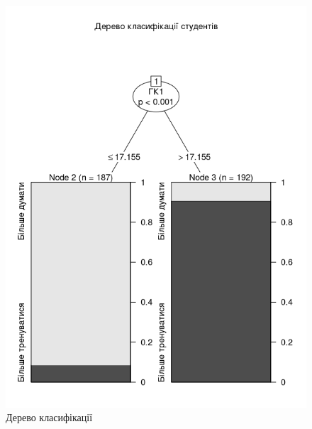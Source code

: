 \begin{figure}[h]
  \centering
    \includegraphics[width=\textwidth]{images/tree_simple}
  \caption{Дерево класифікації}
  \label{fig:tree:simple}
\end{figure}
